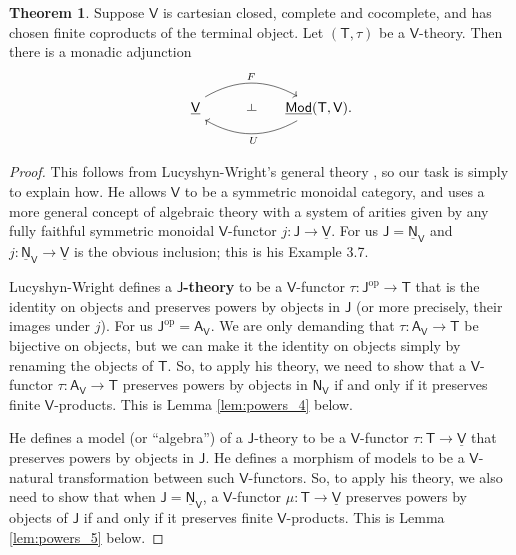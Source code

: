 \documentclass{amsart}
\theoremstyle{definition}
\newtheorem{theorem}{Theorem}
\def\ld{\rotatebox[origin=c]{-90}{$\dashv$}} %
\newcommand{\Mod}{\mathsf{Mod}}
\newcommand{\NN}{\mathsf{N}}
\newcommand{\A}{\mathsf{A}}
\newcommand{\V}{\mathsf{V}}
\newcommand{\J}{\mathsf{J}}
\newcommand{\T}{\mathsf{T}}
\newcommand{\op}{\mathrm{op}}
\newcommand{\maps}{\colon}
\begin{document}
\begin{theorem}
\label{thm:monadicity}
Suppose $\V$ is cartesian closed, complete and cocomplete, and has chosen finite coproducts of the terminal object.  Let $(\T,\tau)$ be a $\V$-theory.  Then there is a monadic adjunction
\[\begin{tikzcd}[column sep=small]
\phantom{AA} \underline{\V} \arrow[bend left,below]{rr}{F}
& {\phantom{Aa} \ld} &
\arrow[bend left,above]{ll}{\;\, U} \underline{\Mod}(\T,\V).
\end{tikzcd}\]
\end{theorem}

\begin{proof}
This follows from Lucyshyn-Wright's general theory \cite{lucyshyn-wright}, so our task is simply to explain how.   He allows $\V$ to be a symmetric monoidal category, and uses a more general concept of algebraic theory with a system of arities given by any fully faithful symmetric monoidal $\V$-functor $j \maps \J \to \underline{\V}$.   For us $\J = \underline{\NN}_\V$ and $j \maps \underline{\NN}_\V \to \underline{\V}$ is the obvious inclusion; this is his Example 3.7.

Lucyshyn-Wright defines a \textbf{$\J$-theory} to be a $\V$-functor $\tau \maps \J^\op \to \T$ that is the identity on objects and preserves powers by objects in $\J$ (or more precisely, their images under $j$).  For us $\J^\op = \A_\V$.   We are only demanding that $\tau \maps \A_\V \to \T$ be bijective on objects, but we can make it the identity on objects simply by renaming the objects of $\T$.  So, to apply his theory, we need to show that a $\V$-functor $\tau \maps \A_\V \to \T$ preserves powers by objects in $\NN_\V$ if and only if it preserves finite $\V$-products.  This is Lemma \ref{lem:powers_4} below.

He defines a model (or ``algebra'') of a $\J$-theory to be a $\V$-functor $\tau \maps \T \to \underline{\V}$ that preserves powers by objects in $\J$.   He defines a morphism of models to be a $\V$-natural transformation between such $\V$-functors.  So, to apply his theory, we also need to show that when $\J = \underline{\NN}_\V$, a $\V$-functor $\mu \maps \T \to \underline{\V}$ preserves powers by objects of $\J$ if and only if it preserves finite $\V$-products.   This is Lemma \ref{lem:powers_5} below.


\end{proof}
\end{document}
